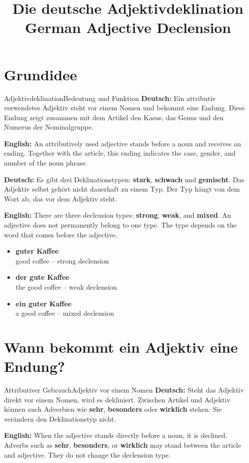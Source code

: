 \documentclass[a4paper,11pt]{article}
\title{Die deutsche Adjektivdeklination\\\large German Adjective Declension}
\date{}
\newcommand{\GermanText}[1]{\textbf{Deutsch: }#1\par}
\newcommand{\EnglishText}[1]{{\small\color{SoftGray}\textbf{English: }#1\par}}
\newcommand{\ExampleItem}[2]{\item \textbf{#1}\\{\small\color{SoftGray}#2}}
\begin{document}
    \maketitle
    \tableofcontents
    \newpage

    \section{Grundidee}

        \begin{grammarentry}{Adjektivdeklination}{Bedeutung und Funktion}
            \GermanText{Ein attributiv verwendetes Adjektiv steht vor einem Nomen und bekommt eine Endung. Diese Endung zeigt zusammen mit dem Artikel den Kasus, das Genus und den Numerus der Nominalgruppe.}
            \EnglishText{An attributively used adjective stands before a noun and receives an ending. Together with the article, this ending indicates the case, gender, and number of the noun phrase.}

            \GermanText{Es gibt drei Deklinationstypen: \textbf{stark}, \textbf{schwach} und \textbf{gemischt}. Das Adjektiv selbst gehört nicht dauerhaft zu einem Typ. Der Typ hängt von dem Wort ab, das vor dem Adjektiv steht.}
            \EnglishText{There are three declension types: \textbf{strong}, \textbf{weak}, and \textbf{mixed}. An adjective does not permanently belong to one type. The type depends on the word that comes before the adjective.}
        \end{grammarentry}

        \begin{exbox}
            \begin{itemize}
                \ExampleItem{guter Kaffee}{good coffee -- strong declension}
                \ExampleItem{der gute Kaffee}{the good coffee -- weak declension}
                \ExampleItem{ein guter Kaffee}{a good coffee -- mixed declension}
            \end{itemize}
        \end{exbox}

    \section{Wann bekommt ein Adjektiv eine Endung?}

        \begin{grammarentry}{Attributiver Gebrauch}{Adjektiv vor einem Nomen}
            \GermanText{Steht das Adjektiv direkt vor einem Nomen, wird es dekliniert. Zwischen Artikel und Adjektiv können auch Adverbien wie \textbf{sehr}, \textbf{besonders} oder \textbf{wirklich} stehen. Sie verändern den Deklinationstyp nicht.}
            \EnglishText{When the adjective stands directly before a noun, it is declined. Adverbs such as \textbf{sehr}, \textbf{besonders}, or \textbf{wirklich} may stand between the article and adjective. They do not change the declension type.}
        \end{grammarentry}
\end{document}
